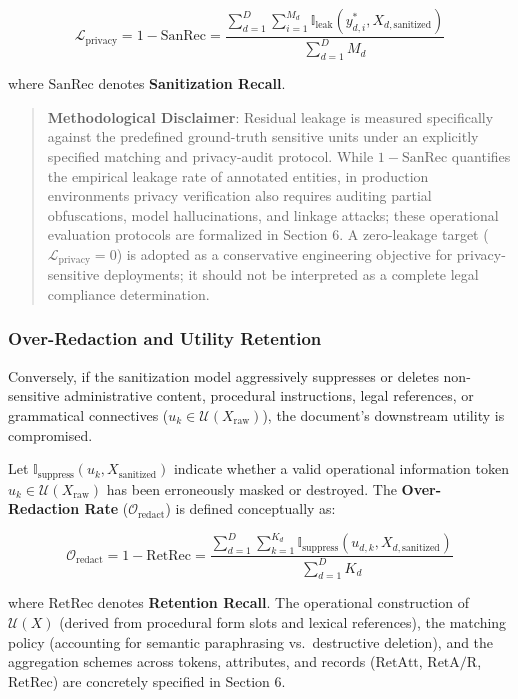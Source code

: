 \documentclass[
]{article}
\begin{document}
\[\mathcal{L}_{\text{privacy}} = 1 - \text{SanRec} = \frac{\sum_{d=1}^D \sum_{i=1}^{M_d} \mathbb{I}_{\text{leak}}(y_{d,i}^*, X_{d,\text{sanitized}})}{\sum_{d=1}^D M_d}\]

where \(\text{SanRec}\) denotes \textbf{Sanitization Recall}.

\begin{quote}
\textbf{Methodological Disclaimer}: Residual leakage is measured
specifically against the predefined ground-truth sensitive units under
an explicitly specified matching and privacy-audit protocol. While
\(1 - \text{SanRec}\) quantifies the empirical leakage rate of annotated
entities, in production environments privacy verification also requires
auditing partial obfuscations, model hallucinations, and linkage
attacks; these operational evaluation protocols are formalized in
Section 6. A zero-leakage target (\(\mathcal{L}_{\text{privacy}} = 0\))
is adopted as a conservative engineering objective for privacy-sensitive
deployments; it should not be interpreted as a complete legal compliance
determination.
\end{quote}

\subsubsection{Over-Redaction and Utility
Retention}\label{over-redaction-and-utility-retention}

Conversely, if the sanitization model aggressively suppresses or deletes
non-sensitive administrative content, procedural instructions, legal
references, or grammatical connectives
(\(u_k \in \mathcal{U}(X_{\text{raw}})\)), the document's downstream
utility is compromised.

Let \(\mathbb{I}_{\text{suppress}}(u_k, X_{\text{sanitized}})\) indicate
whether a valid operational information token
\(u_k \in \mathcal{U}(X_{\text{raw}})\) has been erroneously masked or
destroyed. The \textbf{Over-Redaction Rate}
(\(\mathcal{O}_{\text{redact}}\)) is defined conceptually as:

\[\mathcal{O}_{\text{redact}} = 1 - \text{RetRec} = \frac{\sum_{d=1}^D \sum_{k=1}^{K_d} \mathbb{I}_{\text{suppress}}(u_{d,k}, X_{d,\text{sanitized}})}{\sum_{d=1}^D K_d}\]

where \(\text{RetRec}\) denotes \textbf{Retention Recall}. The
operational construction of \(\mathcal{U}(X)\) (derived from procedural
form slots and lexical references), the matching policy (accounting for
semantic paraphrasing vs.~destructive deletion), and the aggregation
schemes across tokens, attributes, and records (\(\text{RetAtt}\),
\(\text{RetA/R}\), \(\text{RetRec}\)) are concretely specified in
Section 6.
\end{document}
